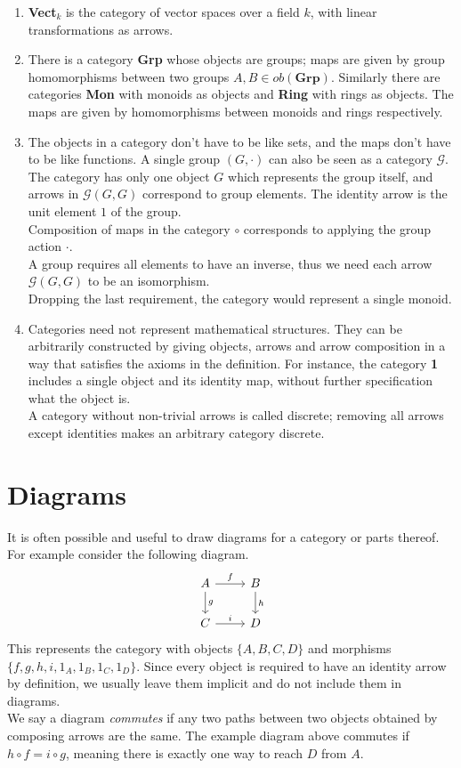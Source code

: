 \begin {enumerate}
  \item \textbf{Vect$_k$} is the category of vector spaces over a field $k$, with linear transformations as arrows.
  
  \item There is a category \textbf{Grp} whose objects are groups; maps are given by group homomorphisms between two groups $A,B \in ob(\textbf{Grp}).$
    Similarly there are categories \textbf{Mon} with monoids as objects and \textbf{Ring} with rings as objects.
    The maps are given by homomorphisms between monoids and rings respectively.
  
  \item
    The objects in a category don't have to be like sets, and the maps don't have to be like functions.
    A single group $(G, \cdot)$ can also be seen as a category $\mathcal{G}$. The category has only one object $G$ which represents the group itself,
    and arrows in $\mathcal{G}(G, G)$  correspond to group elements.
    The identity arrow is the unit element $1$ of the group.\\
    Composition of maps in the category $\circ$ corresponds to applying the group action $\cdot$.\\
    A group requires all elements to have an inverse, thus we need each arrow $\mathcal{G}(G, G)$ to be an isomorphism.\\
    Dropping the last requirement, the category would represent a single monoid.

  
  \item Categories need not represent mathematical structures. They can be arbitrarily constructed by giving objects, arrows and arrow composition in a way that satisfies the axioms in the definition. For instance, the category \textbf{1} includes a single object and its identity map, without further specification what the object is. \\
    A category without non-trivial arrows is called discrete; removing all arrows except identities makes an arbitrary category discrete.
 \end {enumerate}


\section {Diagrams}
It is often possible and useful to draw diagrams for a category or parts thereof.
For example consider the following diagram.
\[
  \begin{tikzcd}
    A \arrow{r}{f} \arrow{d}{g} & B \arrow{d}{h} \\
    C \arrow{r}{i}              & D 
  \end{tikzcd}
\]
This represents the category with objects $\{A, B, C, D\}$ and
morphisms $\{f, g, h, i, 1_A, 1_B, 1_C, 1_D \}$.
Since every object is required to have an identity arrow by definition,
we usually leave them implicit and do not include them in diagrams.\\
We say a diagram \emph{commutes} if any two paths between two objects
obtained by composing arrows are the same.
The example diagram above commutes if $ h \circ f = i \circ g $, meaning there is
exactly one way to reach $D$ from $A$.


